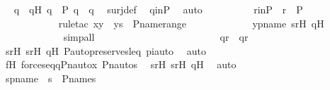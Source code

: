 \begin{isabellebody}
\ \isamarkupfalse%
\ q\ \ qH{\isacharcolon}{\kern0pt}\ {\isachardoublequoteopen}q\ {\isasymin}\ P{\isachardoublequoteclose}\ {\isachardoublequoteopen}{\isasympi}{\isacharbackquote}{\kern0pt}q\ {\isacharequal}{\kern0pt}\ q{\isacharprime}{\kern0pt}{\isachardoublequoteclose}\ \isamarkupfalse%
\ surj{\isacharunderscore}{\kern0pt}def\ \isamarkupfalse%
\ q{\isacharprime}{\kern0pt}inP\ \isamarkupfalse%
\ auto\isanewline
\isanewline
\ \ \ \ \ \ \ \ \isamarkupfalse%
\ rinP\ {\isacharcolon}{\kern0pt}\ {\isachardoublequoteopen}r\ {\isasymin}\ P{\isachardoublequoteclose}\ \isanewline
\ \ \ \ \ \ \ \ \ \ \isamarkupfalse%
\ {\isacharparenleft}{\kern0pt}rule{\isacharunderscore}{\kern0pt}tac\ x{\isacharequal}{\kern0pt}y\ \ y{\isacharequal}{\kern0pt}s\ \ P{\isacharunderscore}{\kern0pt}name{\isacharunderscore}{\kern0pt}range{\isacharparenright}{\kern0pt}\ \isanewline
\ \ \ \ \ \ \ \ \ \ \isamarkupfalse%
\ ypname\ srH\ qH\ \isanewline
\ \ \ \ \ \ \ \ \ \ \ \isamarkupfalse%
\ simp{\isacharunderscore}{\kern0pt}all\ \isanewline
\ \ \ \ \ \ \ \ \ \ \isamarkupfalse%
\ \isanewline
\ \ \ \ \ \ \ \ \isamarkupfalse%
\ \isamarkupfalse%
\ qr\ {\isacharcolon}{\kern0pt}\ {\isachardoublequoteopen}q{\isasympreceq}r{\isachardoublequoteclose}\ \isamarkupfalse%
\ s{\isacharprime}{\kern0pt}r{\isacharprime}{\kern0pt}H\ srH\ qH\ P{\isacharunderscore}{\kern0pt}auto{\isacharunderscore}{\kern0pt}preserves{\isacharunderscore}{\kern0pt}leq{\isacharprime}{\kern0pt}\ piauto\ \isamarkupfalse%
\ auto\isanewline
\isanewline
\ \ \ \ \ \ \ \ \isamarkupfalse%
\ fH{\isacharcolon}{\kern0pt}\ {\isachardoublequoteopen}forces{\isacharunderscore}{\kern0pt}eq{\isacharparenleft}{\kern0pt}{\isasympi}{\isacharbackquote}{\kern0pt}q{\isacharcomma}{\kern0pt}Pn{\isacharunderscore}{\kern0pt}auto{\isacharparenleft}{\kern0pt}{\isasympi}{\isacharparenright}{\kern0pt}{\isacharbackquote}{\kern0pt}x{\isacharcomma}{\kern0pt}\ Pn{\isacharunderscore}{\kern0pt}auto{\isacharparenleft}{\kern0pt}{\isasympi}{\isacharparenright}{\kern0pt}{\isacharbackquote}{\kern0pt}s{\isacharparenright}{\kern0pt}{\isachardoublequoteclose}\ \isamarkupfalse%
\ s{\isacharprime}{\kern0pt}r{\isacharprime}{\kern0pt}H\ srH\ qH\ \isamarkupfalse%
\ auto\ \isanewline
\isanewline
\ \ \ \ \ \ \ \ \isamarkupfalse%
\ spname\ {\isacharcolon}{\kern0pt}\ {\isachardoublequoteopen}s\ {\isasymin}\ P{\isacharunderscore}{\kern0pt}names{\isachardoublequoteclose}\ \isamarkupfalse%

\end{isabellebody}
